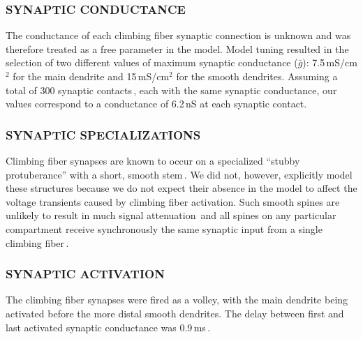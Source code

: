 \documentclass[12pt]{article}
\begin{document}
\subsubsection*{SYNAPTIC CONDUCTANCE}

The conductance of each climbing
fiber synaptic connection is unknown and was therefore treated as
a free parameter in the model. Model tuning resulted in the selection
of two different values of maximum synaptic conductance
($\bar g$): 7.5\,mS/cm$^2$ for the main dendrite and 15\,mS/cm$^2$ for the
smooth dendrites. Assuming a total of 300 synaptic contacts\,\cite{Ito:1984uq}, each with the same synaptic conductance, our values
correspond to a conductance of 6.2\,nS at each synaptic contact.

\subsubsection*{SYNAPTIC SPECIALIZATIONS}

Climbing fiber synapses are
known to occur on a specialized ``stubby protuberance'' with a
short, smooth stem\,\cite{Palay:1974fk}. We did not,
however, explicitly model these structures because we do not expect
their absence in the model to affect the voltage transients
caused by climbing fiber activation. Such smooth spines are unlikely
to result in much signal attenuation\,\cite{Rall:1990tg}
and all spines on any particular compartment receive synchronously 
the same synaptic input from a single climbing fiber\,\cite{Ito:1984uq}.

\subsubsection*{SYNAPTIC ACTIVATION}

The climbing fiber synapses were fired as
a volley, with the main dendrite being activated before the more
distal smooth dendrites. The delay between first and last activated
synaptic conductance was 0.9\,ms\,\cite{Llinas:1980vn}.



\end{document}
